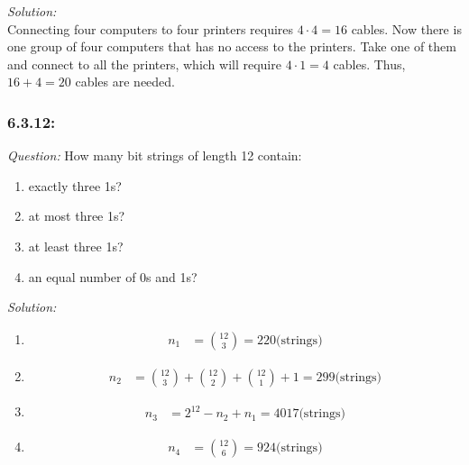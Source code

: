 \documentclass[a4paper]{article}
\begin{document}
	\emph{Solution: }\\
	Connecting four computers to four printers requires $4\cdot 4=16$ cables. Now there is one group of four computers that has no access to the printers. Take one of them and connect to all the printers, which will require $4\cdot1=4$ cables. Thus, $16+4=20$ cables are needed.
	
	\subsubsection*{6.3.12:}
	\textit{Question:} How many bit strings of length 12 contain:
	\begin{enumerate} [label = (\alph*)]
		\item exactly three 1s? 
		\item at most three 1s?
		\item at least three 1s?
		\item an equal number of 0s and 1s?
	\end{enumerate}
	\textit{Solution:}\\
	\begin{enumerate} [label = (\alph*)]
		\item 
		\begin{align*}
		n_1 &= {12 \choose 3} = 220 \text{(strings)}
		\end{align*}
		\item 
		\begin{align*}
		n_2 &= {12 \choose 3} + {12\choose 2} + {12 \choose 1} + 1 = 299 \text{(strings)}
		\end{align*}
		\item 
		\begin{align*}
		n_3 &= 2^{12} - n_2 + n_1 = 4017 \text{(strings)}
		\end{align*}
		\item 
		\begin{align*}
		n_4 &= {12 \choose 6} = 924 \text{(strings)}
		\end{align*}
	\end{enumerate}
	
\end{document}
